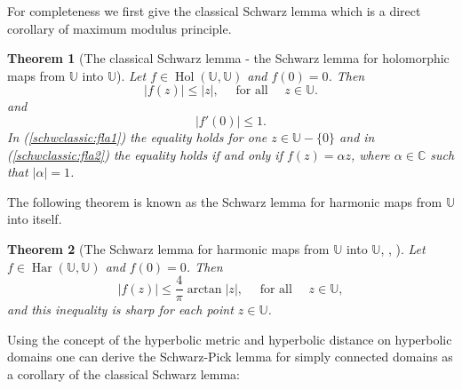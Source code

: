 \documentclass{amsart}
\newcommand{\Hol}{\mathop{\mathrm{Hol}}}
\newcommand{\Har}{\mathop{\mathrm{Har}}}
\newtheorem{theorem}{Theorem}
\begin{document}
For completeness we first give the classical Schwarz lemma  which is a direct  corollary of maximum modulus principle.

\begin{theorem}[The classical Schwarz lemma - the Schwarz lemma for holomorphic maps from $\mathbb{U}$ into $\mathbb{U}$]\label{th:schwclassic}
Let $f\in\Hol(\mathbb{U},\mathbb{U})$ and $f(0)=0$. Then
\begin{equation}\label{schwclassic:fla1}
    |f(z)|\leqslant|z|, \quad \mbox{ for all } \quad z\in\mathbb{U}.
\end{equation}
and
\begin{equation}\label{schwclassic:fla2}
    |f'(0)|\leqslant1.
\end{equation}
In (\ref{schwclassic:fla1}) the equality holds for one $z\in\mathbb{U}-\{0\}$ and in (\ref{schwclassic:fla2}) the equality holds if and only if $f(z)=\alpha z$, where $\alpha\in\mathbb{C}$ such that $|\alpha|=1$.
\end{theorem}

The following theorem is known as the Schwarz lemma for harmonic maps from $\mathbb{U}$ into itself.

\begin{theorem}[The Schwarz lemma for harmonic maps from $\mathbb{U}$ into $\mathbb{U}$, \cite{heinz}, {\cite[p. 77]{duren}}]\label{th:schwharcmplx}
Let $f\in\Har(\mathbb{U},\mathbb{U})$ and $f(0)=0$. Then
\begin{equation}\label{schwharcmplx:fla1}
    |f(z)|\leqslant\frac{4}{\pi}\arctan{|z|}, \quad \mbox{ for all } \quad z\in\mathbb{U},
\end{equation}
and this inequality is sharp for each point $z\in\mathbb{U}$.
\end{theorem}



Using the concept of the hyperbolic metric and hyperbolic distance on hyperbolic domains one can derive the Schwarz-Pick lemma for simply connected domains as a corollary of the classical Schwarz lemma:

\end{document}
